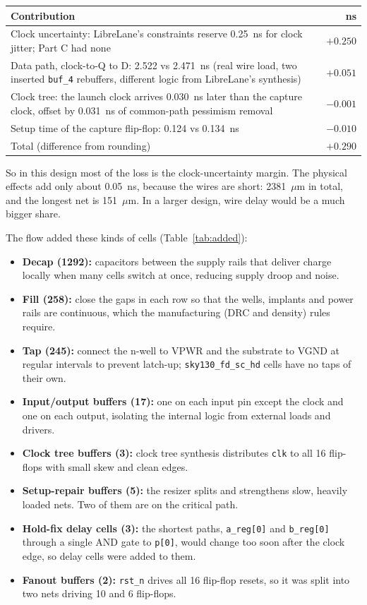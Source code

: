 \documentclass[11pt,a4paper]{article}
\newcommand{\cell}[1]{\texttt{#1}}
\newcommand{\um}{\ensuremath{\mu\mathrm{m}}}
\begin{document}
\begin{table}[H]
\centering
\small
\begin{tabularx}{\textwidth}{Yr}
\toprule
Contribution & ns \\
\midrule
Clock uncertainty: LibreLane's constraints reserve 0.25~ns for clock jitter; Part C had none & $+0.250$ \\
Data path, clock-to-Q to D: 2.522 vs 2.471~ns (real wire load, two inserted \cell{buf\_4} rebuffers, different logic from LibreLane's synthesis) & $+0.051$ \\
Clock tree: the launch clock arrives 0.030~ns later than the capture clock, offset by 0.031~ns of common-path pessimism removal & $-0.001$ \\
Setup time of the capture flip-flop: 0.124 vs 0.134~ns & $-0.010$ \\
\midrule
Total (difference from rounding) & $+0.290$ \\
\bottomrule
\end{tabularx}
\end{table}

So in this design most of the loss is the clock-uncertainty margin. The physical
effects add only about 0.05~ns, because the wires are short: 2381~\um{} in total,
and the longest net is 151~\um. In a larger design, wire delay would be a much
bigger share.

The flow added these kinds of cells (Table~\ref{tab:added}):
\begin{itemize}
  \item \textbf{Decap (1292):} capacitors between the supply rails that deliver
        charge locally when many cells switch at once, reducing supply droop and
        noise.
  \item \textbf{Fill (258):} close the gaps in each row so that the wells, implants
        and power rails are continuous, which the manufacturing (DRC and density)
        rules require.
  \item \textbf{Tap (245):} connect the n-well to VPWR and the substrate to VGND at
        regular intervals to prevent latch-up; \texttt{sky130\_fd\_sc\_hd} cells have
        no taps of their own.
  \item \textbf{Input/output buffers (17):} one on each input pin except the clock
        and one on each output, isolating the internal logic from external loads and
        drivers.
  \item \textbf{Clock tree buffers (3):} clock tree synthesis distributes
        \texttt{clk} to all 16 flip-flops with small skew and clean edges.
  \item \textbf{Setup-repair buffers (5):} the resizer splits and strengthens slow,
        heavily loaded nets. Two of them are on the critical path.
  \item \textbf{Hold-fix delay cells (3):} the shortest paths, \texttt{a\_reg[0]}
        and \texttt{b\_reg[0]} through a single AND gate to \texttt{p[0]}, would
        change too soon after the clock edge, so delay cells were added to them.
  \item \textbf{Fanout buffers (2):} \texttt{rst\_n} drives all 16 flip-flop resets,
        so it was split into two nets driving 10 and 6 flip-flops.
\end{itemize}
\end{document}

